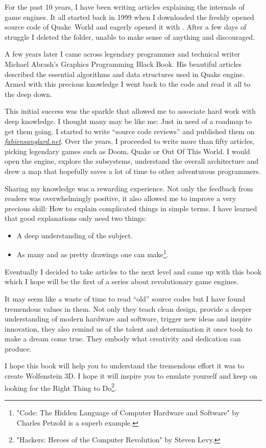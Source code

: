 \documentclass[book.tex]{subfiles}
\begin{document}
For the past 10 years, I have been writing articles explaining the internals of game engines. It all started back in 1999 when I downloaded the freshly opened source code of \mbox{Quake World} and eagerly opened it with . After a few days of struggle I deleted the  folder, unable to make sense of anything and discouraged.

\bigskip

A few years later I came across legendary programmer and technical writer Michael Abrash's Graphics Programming Black Book. His beautiful articles described the essential algorithms and data structures used in Quake engine. Armed with this precious knowledge I went back to the code and read it all to the deep down.

\bigskip

This initial success was the sparkle that allowed me to associate hard work with deep knowledge. I thought many may be like me: Just in need of a roadmap to get them going. I started to write ``source  code reviews'' and published them on 
\href{http://fabiensanglard.net}{\textit{fabiensanglard.net}}. Over the years, I proceeded to write more than fifty articles,  picking legendary games such as Doom, Quake or Out Of This World. I would open the engine, explore the subsystems, understand the overall architecture and drew a map that hopefully saves a lot of time to other adventurous programmers.

\bigskip

Sharing my knowledge was a rewarding experience. Not only the feedback from readers was overwhelmingly positive, it also allowed me to improve a very precious skill: How to explain complicated things in simple terms. I have learned that good explanations only need two things: 
\begin{itemize} 
\item A deep understanding of the subject. 
\item As many and as pretty drawings one can make\footnote{"Code: The Hidden Language of Computer Hardware and Software" by Charles Petzold is a superb example.}.
\end{itemize} 

\bigskip

Eventually I decided to take articles to the next level and came up with this book which I hope will be the first of a series about revolutionary game engines. 

\bigskip

It may seem like a waste of time to read ``old'' source codes but I have found  tremendous values in them. Not only they teach clean design, provide a deeper understanding of modern hardware and software, trigger new ideas and inspire innovation, they also remind us of the talent and determination it once took to make a dream come true. They embody what creativity and dedication can produce.

\bigskip

I hope this book will help you to understand the tremendous effort it was to create Wolfenstein 3D. I hope it will inspire you to emulate yourself and keep on looking for the Right Thing to Do\footnote{"Hackers: Heroes of the Computer Revolution" by Steven Levy.}.
\end{document}
